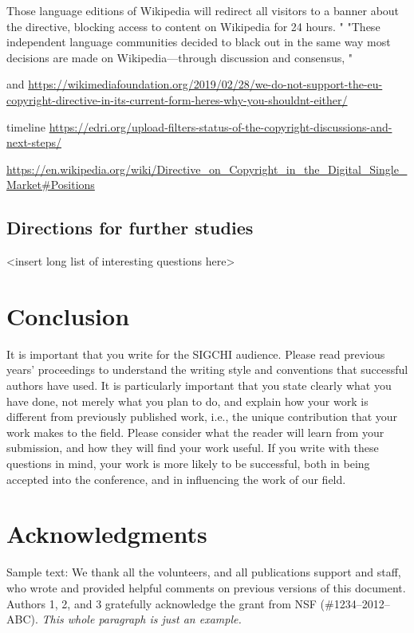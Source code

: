 \documentclass{sigchi}
\begin{document}
Those language editions of Wikipedia will redirect all visitors to a banner about the directive, blocking access to content on Wikipedia for 24 hours. "
"These independent language communities decided to black out in the same way most decisions are made on Wikipedia—through discussion and consensus, "

and
\url{https://wikimediafoundation.org/2019/02/28/we-do-not-support-the-eu-copyright-directive-in-its-current-form-heres-why-you-shouldnt-either/}

timeline
\url{https://edri.org/upload-filters-status-of-the-copyright-discussions-and-next-steps/}

\url{https://en.wikipedia.org/wiki/Directive_on_Copyright_in_the_Digital_Single_Market#Positions}

\subsection{Directions for further studies}
<insert long list of interesting questions here>

\section{Conclusion}

It is important that you write for the SIGCHI audience. Please read
previous years' proceedings to understand the writing style and
conventions that successful authors have used. It is particularly
important that you state clearly what you have done, not merely what
you plan to do, and explain how your work is different from previously
published work, i.e., the unique contribution that your work makes to
the field. Please consider what the reader will learn from your
submission, and how they will find your work useful. If you write with
these questions in mind, your work is more likely to be successful,
both in being accepted into the conference, and in influencing the
work of our field.

\section{Acknowledgments}

Sample text: We thank all the volunteers, and all publications support
and staff, who wrote and provided helpful comments on previous
versions of this document. Authors 1, 2, and 3 gratefully acknowledge
the grant from NSF (\#1234--2012--ABC). \textit{This whole paragraph is
  just an example.}
\end{document}
